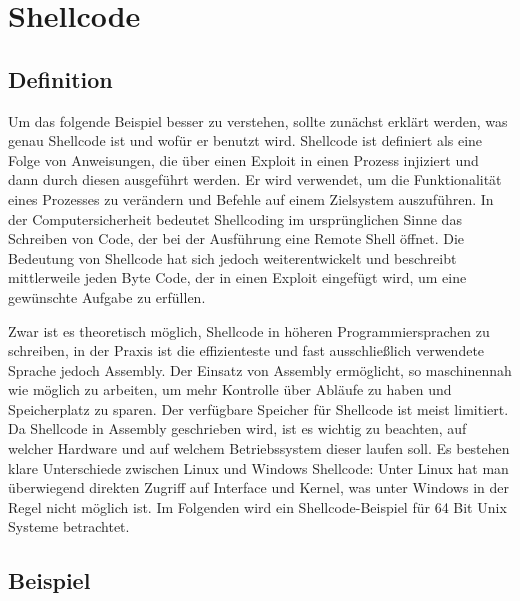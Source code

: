 \section{Shellcode} \label{sec:shellcode}
\subsection{Definition}
Um das folgende Beispiel besser zu verstehen, sollte zunächst erklärt werden, was genau Shellcode ist und wofür er benutzt wird.
Shellcode ist definiert als eine Folge von Anweisungen, die über einen Exploit in einen Prozess injiziert und
dann durch diesen ausgeführt werden. Er wird verwendet, um die Funktionalität eines Prozesses zu verändern und
Befehle auf einem Zielsystem auszuführen. In der Computersicherheit bedeutet Shellcoding im ursprünglichen Sinne
das Schreiben von Code, der bei der Ausführung eine Remote Shell öffnet. Die Bedeutung von Shellcode hat sich jedoch weiterentwickelt und
beschreibt mittlerweile jeden Byte Code, der in einen Exploit eingefügt wird, um eine gewünschte Aufgabe zu erfüllen.

Zwar ist es theoretisch möglich, Shellcode in höheren Programmiersprachen zu schreiben, in der Praxis ist die effizienteste und
fast ausschließlich verwendete Sprache jedoch Assembly. Der Einsatz von Assembly ermöglicht, so maschinennah wie möglich zu arbeiten,
um mehr Kontrolle über Abläufe zu haben und Speicherplatz zu sparen. Der verfügbare Speicher für Shellcode ist meist limitiert.
Da Shellcode in Assembly geschrieben wird, ist es wichtig zu beachten, auf welcher Hardware und auf welchem Betriebssystem dieser laufen soll.
Es bestehen klare Unterschiede zwischen Linux und Windows Shellcode: Unter Linux hat man überwiegend direkten Zugriff auf Interface und Kernel,
was unter Windows in der Regel nicht möglich ist. Im Folgenden wird ein Shellcode-Beispiel für 64 Bit Unix Systeme betrachtet. \cite{tutorial1}

\subsection{Beispiel}


